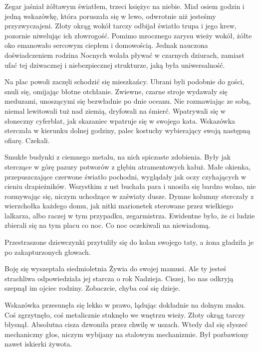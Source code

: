 Zegar jaśniał żółtawym światłem, trzeci księżyc na niebie.
Miał osiem godzin i jedną wskazówkę, która poruszała się w lewo, odwrotnie niż jesteśmy przyzwyczajeni.
Złoty okrąg wokół tarczy odbijał światło trupa i jego krew, pozornie niwelując ich złowrogość.
Pomimo mrocznego zarysu wieży wokół, żółte oko emanowało sercowym ciepłem i domowością.
Jednak nauczona doświadczeniem rodzina Nocnych wolała pływać w czarnych dziurach, zamiast ufać tej dziwacznej i niebezpiecznej strukturze, jaką była uniwersalność.

Na plac powoli zaczęli schodzić się mieszkańcy.
Ubrani byli podobnie do gości, snuli się, omijając błotne otchłanie.
Zwiewne, czarne stroje wydawały się meduzami, unoszącymi się bezwładnie po dnie oceanu.
Nie rozmawiając ze sobą, niemal lewitowali tuż nad ziemią, dryfowali na śmierć.
Wpatrywali się w słoneczny cyferblat, jak skazaniec wpatruje się w swojego kata.
Wskazówka sterczała w kierunku dolnej godziny, palec kostuchy wybierający swoją następną ofiarę.
Czekali.

Smukłe budynki z ciemnego metalu, na nich spiczaste zdobienia. 
Były jak sterczące w górę pazury potworów z głębin atramentowych kałuż.
Małe okienka, przepuszczające czerwone światło pochodni, wyglądały jak oczy czyhających w cieniu drapieżników.
Wszystkim z ust buchała para i unosiła się bardzo wolno, nie rozmywając się, niczym uchodzące w zaświaty dusze.
Dymne kolumny sterczały z wierzchołka każdego domu, jak nitki marionetek sterowane przez wielkiego lalkarza, albo raczej w tym przypadku, zegarmistrza.
Ewidentne było, że ci ludzie zbierali się na tym placu co noc.
Co noc oczekiwali na niewiadomą.

Przestraszone dziewczynki przytuliły się do kolan swojego taty, a żona gładziła je po zakapturzonych głowach.
\begin{dialogue}
	\ds{} Boję się \dm{} wyszeptała siedmioletnia Żywia do swojej mamusi.
	\ds{} Ale ty jesteś strachliwa \dm{} odpowiedziała jej starcza o rok Nadzieja.
	\ds{} Ciszej, bo nas odkryją \dm{} szepnął im ojciec rodziny. \dm{} Zobaczcie, chyba coś się dzieje.
\end{dialogue}

Wskazówka przesunęła się lekko w prawo, lądując dokładnie na dolnym znaku. 
Coś zgrzytnęło, coś metalicznie stuknęło we wnętrzu wieży.
Złoty okrąg tarczy błysnął.
Absolutna cisza dzwoniła przez chwilę w uszach.
Wtedy dał się słyszeć mechaniczny głos, niczym wybijany na stalowym mechanizmie.
Był pozbawiony nawet iskierki żywota.

